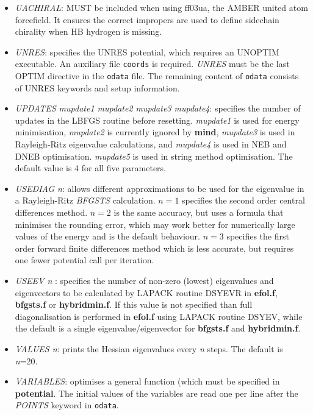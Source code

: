 \documentclass[12pt,a4paper,dvips]{article}
\begin{document}
\begin{itemize}
\item {\it UACHIRAL\/}: MUST be included when using ff03ua, the AMBER united atom forcefield. It ensures the correct impropers are used to define sidechain 
chirality when HB hydrogen is missing.

\item {\it UNRES\/}: specifies the UNRES potential, which requires an UNOPTIM executable.
An auxiliary file {\tt coords} is required. {\it UNRES} must be the last OPTIM directive in the
{\tt odata} file. The remaining content of {\tt odata} consists of UNRES keywords and
setup information.

\item {\it UPDATES mupdate1 mupdate2 mupdate3 mupdate4\/}: 
specifies the number of updates in the LBFGS routine before
      resetting. 
{\it mupdate1\/} is used for energy minimisation, 
{\it mupdate2\/} is currently ignored by {\bf mind},
{\it mupdate3\/} is used in Rayleigh-Ritz eigenvalue calculations, and 
{\it mupdate4\/} is used in NEB and DNEB optimisation. 
{\it mupdate5\/} is used in string method optimisation. 
The default value is 4 for all five parameters.

\item {\it USEDIAG n\/}: allows different approximations to be used for the 
eigenvalue in a Rayleigh-Ritz {\it BFGSTS\/} calculation. $n=1$ specifies the
second order central differences method.
$n=2$ is the same accuracy, but uses a formula that minimises the rounding
error, which may work better for numerically large values of the energy and
is the default behaviour. $n=3$ specifies the first order forward finite 
differences method which is less accurate, but requires one fewer potential 
call per iteration.

\item {\it USEEV n \/}: specifies the number of non-zero (lowest) eigenvalues and
eigenvectors to be calculated by LAPACK routine DSYEVR in {\bf efol.f},
{\bf bfgsts.f} or {\bf hybridmin.f}.
If this value is not specified than full diagonalisation is performed in 
{\bf efol.f} using LAPACK routine DSYEV, while the default is a single
eigenvalue/eigenvector for {\bf bfgsts.f} and {\bf hybridmin.f}.

\item {\it VALUES n\/}: prints the Hessian eigenvalues every {\it n\/} steps.
The default is {\it n\/}=20.

\item {\it VARIABLES\/}: optimises a general function (which must be specified in
{\bf potential}. The initial values of the variables are read one per line after the {\it POINTS\/}
keyword in {\tt odata}.


\end{itemize}
\end{document}
